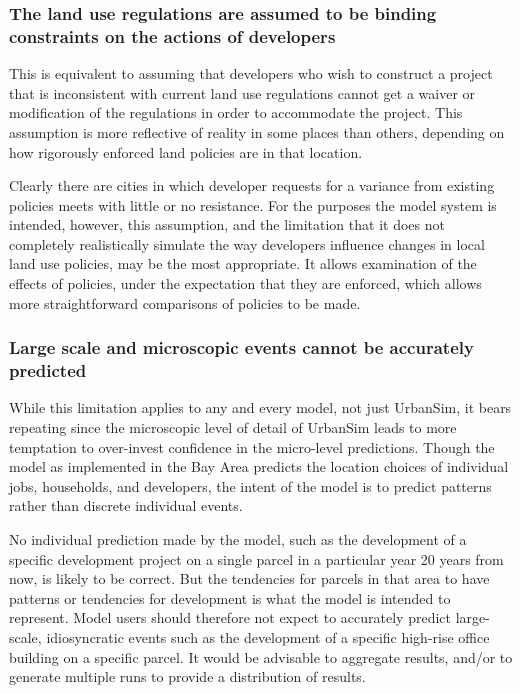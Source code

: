\subsubsection{The land use regulations are assumed to be binding constraints
on the actions of developers}

This is equivalent to assuming that developers who wish to construct a project that is inconsistent with current land use regulations cannot get a waiver or modification of the regulations in order to accommodate the project. This assumption
is more reflective of reality in some places than others, depending on how rigorously enforced land policies are in that location.

Clearly there are cities in which developer requests for a variance from existing policies meets with little or no resistance. For the purposes the model system is intended, however, this assumption, and the limitation that it does not completely realistically simulate the way developers influence changes in local land use policies, may be the most appropriate. It allows examination of the effects of policies, under the expectation that they are enforced, which allows more straightforward comparisons of policies to be made.

\subsubsection{Large scale and microscopic events cannot be accurately predicted}

While this limitation applies to any and every model, not just UrbanSim, it bears repeating since the microscopic level of detail of UrbanSim leads to more temptation to over-invest confidence in the micro-level predictions. Though the model as implemented in the Bay Area predicts the location choices of individual jobs, households, and developers, the intent of the model is to predict patterns rather than discrete individual events.

No individual prediction made by the model, such as the development of a specific development project on a single parcel in a particular year 20 years from now, is likely to be correct. But the tendencies for parcels in that area to have patterns or tendencies for development is what the model is intended to represent. Model users should therefore not expect to accurately predict large-scale, idiosyncratic events such as the development of a specific high-rise office building on a specific parcel. It would be advisable to aggregate results, and/or to generate multiple runs to provide a distribution of results.


